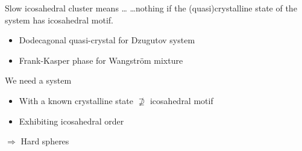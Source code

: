 \begin{frame}{Slow icosahedral cluster means \dots}
\dots \alert{nothing} if the (quasi)crystalline state of the system has icosahedral motif.
\begin{itemize}
	\item Dodecagonal quasi-crystal for Dzugutov system\\{\footnotesize\citet{Doye2003}}
	\item Frank-Kasper phase for Wangstr\"om mixture\\{\footnotesize\citet{Pedersen2010, Coslovich2011}}
\end{itemize}

\begin{block}{We need a system}
\begin{itemize}
	\item With a known crystalline state $\nsupseteq$ icosahedral motif
	\item Exhibiting icosahedral order
\end{itemize}
\centering$\Longrightarrow$ Hard spheres
\end{block}
\end{frame}